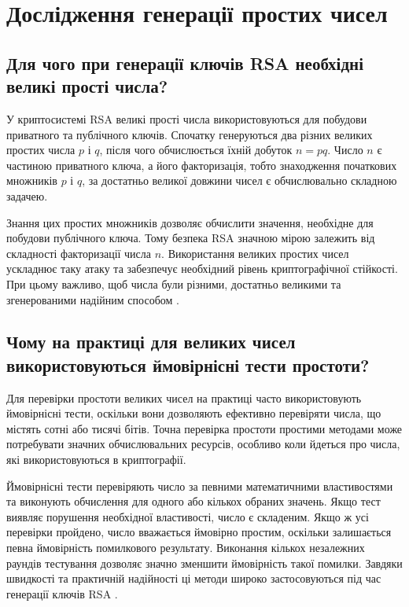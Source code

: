 \section{Дослідження генерації простих чисел}


\subsection{Для чого при генерації ключів RSA необхідні великі прості числа?}

У криптосистемі RSA великі прості числа використовуються для побудови приватного та публічного ключів. 
Спочатку генеруються два різних великих простих числа $p$ і $q$, після чого обчислюється їхній добуток $n=pq$.
Число $n$ є частиною приватного ключа, а його факторизація, тобто знаходження початкових множників $p$ і $q$, 
за достатньо великої довжини чисел є обчислювально складною задачею.

Знання цих простих множників дозволяє обчислити значення, необхідне для побудови публічного ключа. 
Тому безпека RSA значною мірою залежить від складності факторизації числа $n$. 
Використання великих простих чисел ускладнює таку атаку та забезпечує необхідний рівень криптографічної стійкості.
При цьому важливо, щоб числа були різними, достатньо великими та згенерованими надійним способом \cite{RSA,NIST80056B}.

\subsection{Чому на практиці для великих чисел використовуються ймовірнісні тести простоти?}

Для перевірки простоти великих чисел на практиці часто використовують ймовірнісні тести, 
оскільки вони дозволяють ефективно перевіряти числа, що містять сотні або тисячі бітів. 
Точна перевірка простоти простими методами може потребувати значних обчислювальних ресурсів, 
особливо коли йдеться про числа, які використовуються в криптографії.

Ймовірнісні тести перевіряють число за певними математичними властивостями та виконують обчислення для одного або кількох обраних значень. 
Якщо тест виявляє порушення необхідної властивості, число є складеним. Якщо ж усі перевірки пройдено, число вважається ймовірно простим, 
оскільки залишається певна ймовірність помилкового результату. Виконання кількох незалежних раундів тестування дозволяє значно зменшити 
ймовірність такої помилки. Завдяки швидкості та практичній надійності ці методи широко застосовуються під час генерації ключів RSA \cite{MillerRabin,Rabin}.

